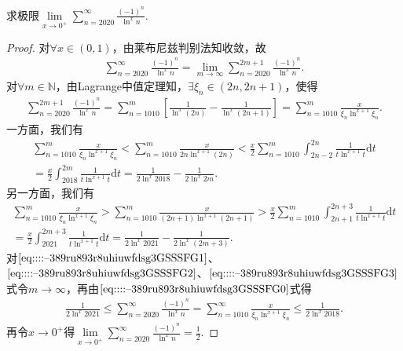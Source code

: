 \documentclass[../../main.tex]{subfiles}%
\begin{document}
\begin{example}
求极限$\underset{x\rightarrow 0^+}{\lim}\sum_{n=2020}^{\infty}{\frac{\left( -1 \right) ^n}{\ln ^xn}}.$
\end{example}
\begin{proof}

对$\forall x\in (0,1)$，由莱布尼兹判别法知收敛，故
\begin{align}\label{eq::::--389ru893r8uhiuwfdsg3GSSSFG0}
\sum\limits_{n=2020}^{\infty}\frac{(-1)^n}{\ln^x n}=\lim\limits_{m\rightarrow \infty}\sum\limits_{n=2020}^{2m+1}\frac{(-1)^n}{\ln^x n}.
\end{align}
对$\forall m\in \mathbb{N}$，由Lagrange中值定理知，$\exists \xi_n\in (2n,2n+1)$，使得
\begin{align}\label{eq::::--389ru893r8uhiuwfdsg3GSSSFG1}
\sum\limits_{n=2020}^{2m+1}\frac{(-1)^n}{\ln^x n}=\sum\limits_{n=1010}^{m}\left[ \frac{1}{\ln^x (2n)}-\frac{1}{\ln^x (2n+1)} \right]=\sum\limits_{n=1010}^{m}\frac{x}{\xi_n \ln^{x+1}\xi_n}.
\end{align}
一方面，我们有
\begin{align}\label{eq::::--389ru893r8uhiuwfdsg3GSSSFG2}
\sum\limits_{n=1010}^{m}\frac{x}{\xi_n \ln^{x+1}\xi_n}<\sum\limits_{n=1010}^{m}\frac{x}{2n\ln^{x+1}(2n)}<\frac{x}{2}\sum\limits_{n=1010}^{m}\int_{2n-2}^{2n}\frac{1}{t\ln^{x+1}t}\mathrm{d}t\nonumber\\
=\frac{x}{2}\int_{2018}^{2m}\frac{1}{t\ln^{x+1}t}\mathrm{d}t=\frac{1}{2\ln^x 2018}-\frac{1}{2\ln^x 2m}.
\end{align}
另一方面，我们有
\begin{align}\label{eq::::--389ru893r8uhiuwfdsg3GSSSFG3}
\sum\limits_{n=1010}^{m}\frac{x}{\xi_n \ln^{x+1}\xi_n}>\sum\limits_{n=1010}^{m}\frac{x}{(2n+1)\ln^{x+1}(2n+1)}>\frac{x}{2}\sum\limits_{n=1010}^{m}\int_{2n+1}^{2n+3}\frac{1}{t\ln^{x+1}t}\mathrm{d}t\nonumber\\
=\frac{x}{2}\int_{2021}^{2m+3}\frac{1}{t\ln^{x+1}t}\mathrm{d}t=\frac{1}{2\ln^x 2021}-\frac{1}{2\ln^x (2m+3)}.
\end{align}
对$\eqref{eq::::--389ru893r8uhiuwfdsg3GSSSFG1}$、$\eqref{eq::::--389ru893r8uhiuwfdsg3GSSSFG2}$、$\eqref{eq::::--389ru893r8uhiuwfdsg3GSSSFG3}$式令$m\rightarrow \infty$，再由$\eqref{eq::::--389ru893r8uhiuwfdsg3GSSSFG0}$式得
\begin{align*}
\frac{1}{2\ln^x 2021}\leqslant \sum\limits_{n=2020}^{\infty}\frac{(-1)^n}{\ln^x n}=\sum\limits_{n=1010}^{\infty}\frac{x}{\xi_n \ln^{x+1}\xi_n}\leqslant \frac{1}{2\ln^x 2018}.
\end{align*}
再令$x\rightarrow 0^+$得$\lim\limits_{x\rightarrow 0^+}\sum\limits_{n=2020}^{\infty}\frac{(-1)^n}{\ln^x n}=\frac{1}{2}.$
\end{proof}
\end{document}

